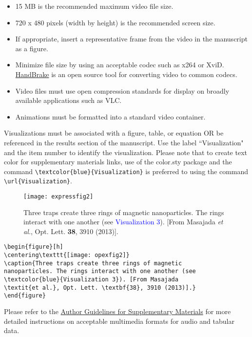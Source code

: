 \documentclass[10pt]{article}
\begin{document}
\begin{itemize}
\item 15 MB is the recommended maximum video file size.
\item 720 x 480 pixels (width by height) is the recommended screen size.
\item If appropriate, insert a representative frame from the video in the manuscript as a figure.
\item Minimize file size by using an acceptable codec such as x264 or XviD. \href{https://handbrake.fr/}{HandBrake} is an open source tool for converting video to common codecs.
\item Video files must use open compression standards for display on broadly available applications such as VLC.
\item Animations must be formatted into a standard video container.
\end{itemize}

Visualizations must be associated with a figure, table, or equation OR be referenced in the results section of the manuscript. Use the label ``Visualization" and the item number to identify the visualization. Please note that to create text color for supplementary materials links, use of the color.sty package and the command \verb|\textcolor{blue}{Visualization}| is preferred to using the command \verb|\url{Visualization}|.

\newpage

\begin{figure}[ht!]
\centering\texttt{[image: expressfig2]}
\caption{Three traps create three rings of magnetic nanoparticles. The rings interact with one another (see \textcolor{blue}{Visualization 3}). [From Masajada \textit{et al.}, Opt. Lett. \textbf{38}, 3910 (2013)].}
\end{figure}

\begin{verbatim}
\begin{figure}[h]
\centering\texttt{[image: opexfig2]}
\caption{Three traps create three rings of magnetic
nanoparticles. The rings interact with one another (see
\textcolor{blue}{Visualization 3}). [From Masajada
\textit{et al.}, Opt. Lett. \textbf{38}, 3910 (2013)].}
\end{figure}
\end{verbatim}

Please refer to the \href{http://www.osapublishing.org/submit/style/multimedia.cfm}{Author Guidelines for Supplementary Materials} for more detailed instructions on acceptable multimedia formats for audio and tabular data.
\end{document}
